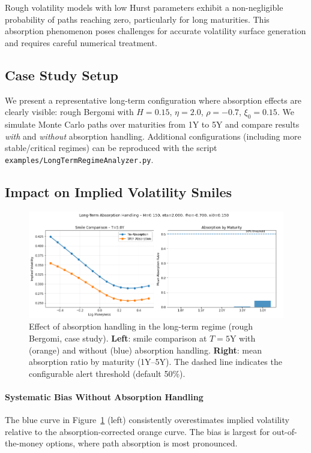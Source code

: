 	Rough volatility models with low Hurst parameters exhibit a non-negligible probability of paths reaching zero, particularly for long maturities. This absorption phenomenon poses challenges for accurate volatility surface generation and requires careful numerical treatment.
	
	\subsection{Case Study Setup}
	
	We present a representative long-term configuration where absorption effects are clearly visible:
	rough Bergomi with $H = 0.15$, $\eta = 2.0$, $\rho = -0.7$, $\xi_0 = 0.15$.
	We simulate Monte Carlo paths over maturities from 1Y to 5Y and compare results \emph{with}
	and \emph{without} absorption handling. Additional configurations (including more stable/critical
	regimes) can be reproduced with the script \texttt{examples/LongTermRegimeAnalyzer.py}.
	
	\subsection{Impact on Implied Volatility Smiles}
	
	\begin{figure}[ht]
		\centering
		\includegraphics[width=\textwidth]{../images/long_term_analysis_comparison.png}
		\caption{Effect of absorption handling in the long-term regime (rough Bergomi, case study).
			\textbf{Left}: smile comparison at $T=5$Y with (orange) and without (blue) absorption handling.
			\textbf{Right}: mean absorption ratio by maturity (1Y–5Y). The dashed line indicates the configurable alert threshold (default 50\%).}
		\label{fig:absorption-comparison}
	\end{figure}
	
	\paragraph{Systematic Bias Without Absorption Handling}
	The blue curve in Figure~\ref{fig:absorption-comparison} (left) consistently overestimates implied volatility relative to the absorption-corrected orange curve. The bias is largest for out-of-the-money options, where path absorption is most pronounced.
	
